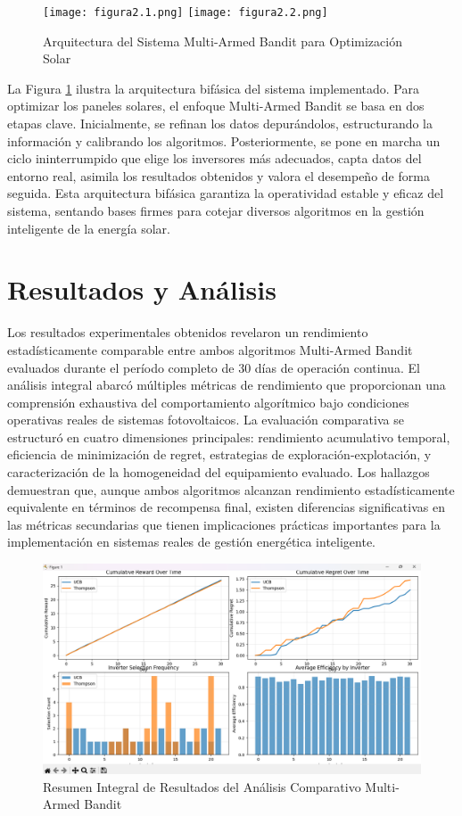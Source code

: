 \documentclass[conference]{IEEEtran}
\begin{document}
\begin{figure}[H]
\centering
\texttt{[image: figura2.1.png]}
\texttt{[image: figura2.2.png]}
\caption{Arquitectura del Sistema Multi-Armed Bandit para Optimización Solar}
\label{fig:flowchart}
\end{figure}

La Figura \ref{fig:flowchart} ilustra la arquitectura bifásica del sistema implementado. Para optimizar los paneles solares, el enfoque Multi-Armed Bandit se basa en dos etapas clave. Inicialmente, se refinan los datos depurándolos, estructurando la información y calibrando los algoritmos. Posteriormente, se pone en marcha un ciclo ininterrumpido que elige los inversores más adecuados, capta datos del entorno real, asimila los resultados obtenidos y valora el desempeño de forma seguida. Esta arquitectura bifásica garantiza la operatividad estable y eficaz del sistema, sentando bases firmes para cotejar diversos algoritmos en la gestión inteligente de la energía solar.

\section{Resultados y Análisis}

Los resultados experimentales obtenidos revelaron un rendimiento estadísticamente comparable entre ambos algoritmos Multi-Armed Bandit evaluados durante el período completo de 30 días de operación continua. El análisis integral abarcó múltiples métricas de rendimiento que proporcionan una comprensión exhaustiva del comportamiento algorítmico bajo condiciones operativas reales de sistemas fotovoltaicos. La evaluación comparativa se estructuró en cuatro dimensiones principales: rendimiento acumulativo temporal, eficiencia de minimización de regret, estrategias de exploración-explotación, y caracterización de la homogeneidad del equipamiento evaluado. Los hallazgos demuestran que, aunque ambos algoritmos alcanzan rendimiento estadísticamente equivalente en términos de recompensa final, existen diferencias significativas en las métricas secundarias que tienen implicaciones prácticas importantes para la implementación en sistemas reales de gestión energética inteligente.

\begin{figure}[H]
\centering
\includegraphics[width=1.0\columnwidth]{figura1.png}
\caption{Resumen Integral de Resultados del Análisis Comparativo Multi-Armed Bandit}
\label{fig:results_combined}
\end{figure}
\end{document}
